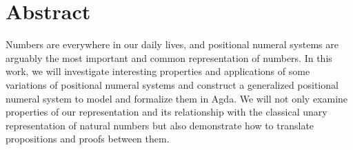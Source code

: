 \documentclass[\main/thesis.tex]{subfiles}
\begin{document}
\chapter*{Abstract}
Numbers are everywhere in our daily lives, and positional numeral systems are
arguably the most important and common representation of numbers.
In this work, we will investigate interesting properties and applications of
some variations of positional numeral systems and construct a generalized
positional numeral system to model and formalize them in Agda.
We will not only examine properties of our representation and its relationship
with the classical unary representation of natural numbers but also demonstrate
how to translate propositions and proofs between them.
\end{document}
